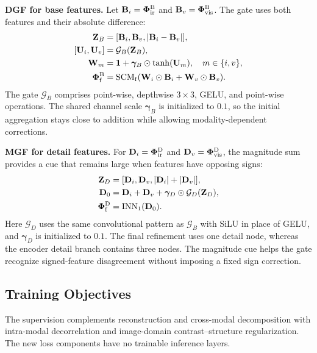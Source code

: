 \textbf{DGF for base features.}
Let $\mathbf B_i=\bm{\Phi}^{\text{B}}_{\mathrm{ir}}$ and $\mathbf B_v=\bm{\Phi}^{\text{B}}_{\mathrm{vis}}$. The gate uses both features and their absolute difference:
\begin{equation}
\begin{aligned}
 \mathbf Z_B&=[\mathbf B_i,\mathbf B_v,|\mathbf B_i-\mathbf B_v|],\\
 [\mathbf U_i,\mathbf U_v]&=\mathcal G_B(\mathbf Z_B),\\
 \mathbf W_m&=\mathbf1+\boldsymbol\gamma_B\odot\tanh(\mathbf U_m),
 \quad m\in\{i,v\},\\
 \bm{\Phi}^{\text{B}}_{\mathrm f}&=\operatorname{SCM}_{\mathrm f}
            (\mathbf W_i\odot\mathbf B_i+\mathbf W_v\odot\mathbf B_v).
\end{aligned}
\end{equation}
The gate $\mathcal G_B$ comprises point-wise, depthwise $3\times3$, GELU, and point-wise operations. The shared channel scale $\boldsymbol\gamma_B$ is initialized to $0.1$, so the initial aggregation stays close to addition while allowing modality-dependent corrections.

\textbf{MGF for detail features.}
For $\mathbf D_i=\bm{\Phi}^{\text{D}}_{\mathrm{ir}}$ and $\mathbf D_v=\bm{\Phi}^{\text{D}}_{\mathrm{vis}}$, the magnitude sum provides a cue that remains large when features have opposing signs:
\begin{equation}
\begin{aligned}
 \mathbf Z_D&=[\mathbf D_i,\mathbf D_v,|\mathbf D_i|+|\mathbf D_v|],\\
 \mathbf D_0&=\mathbf D_i+\mathbf D_v+
                  \boldsymbol\gamma_D\odot\mathcal G_D(\mathbf Z_D),\\
 \bm{\Phi}^{\text{D}}_{\mathrm f}&=\operatorname{INN}_1(\mathbf D_0).
\end{aligned}
\end{equation}
Here $\mathcal G_D$ uses the same convolutional pattern as $\mathcal G_B$ with SiLU in place of GELU, and $\boldsymbol\gamma_D$ is initialized to $0.1$. The final refinement uses one detail node, whereas the encoder detail branch contains three nodes. The magnitude cue helps the gate recognize signed-feature disagreement without imposing a fixed sign correction.

\subsection{Training Objectives}\label{subsec:loss_functions}
The supervision complements reconstruction and cross-modal decomposition with intra-modal decorrelation and image-domain contrast--structure regularization. The new loss components have no trainable inference layers.

